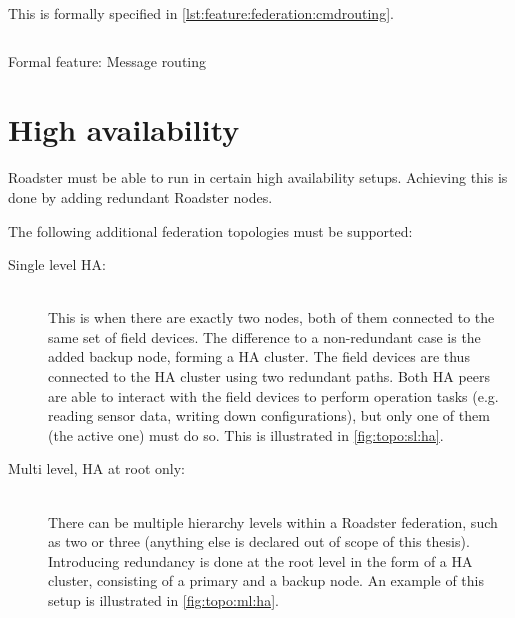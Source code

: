 This is formally specified in \autoref{lst:feature:federation:cmdrouting}.

\begin{listing}
	\inputminted{Gherkin}{listings/features/federation/message_routing.feature}
	\caption{Formal feature: Message routing}
	\label{lst:feature:federation:cmdrouting}
\end{listing}

\section{High availability}
Roadster must be able to run in certain high availability setups. Achieving
this is done by adding redundant Roadster nodes.

The following additional federation topologies must be supported:
\begin{description}
	\item [ Single level \gls{HA}: ] \hfill\\
		This is when there are exactly two nodes, both of them
		connected to the same set of field devices. The difference to a
		non-redundant case is the added backup node, forming a HA
		cluster. The field devices are thus connected to the HA cluster
		using two redundant paths. Both HA peers are able to interact
		with the field devices to perform operation tasks (e.g. reading
		sensor data, writing down configurations), but only one of them
		(the active one) must do so. This is illustrated in
		\autoref{fig:topo:sl:ha}.

	\item [ Multi level, \gls{HA} at root only: ] \hfill\\
		There can be multiple hierarchy levels within a Roadster federation, such as two or
		three (anything else is declared out of scope of this thesis). Introducing
		redundancy is done at the root level in the form of a HA
		cluster, consisting of a primary and a backup node. An example of this setup is illustrated in
		\autoref{fig:topo:ml:ha}.
\end{description}

